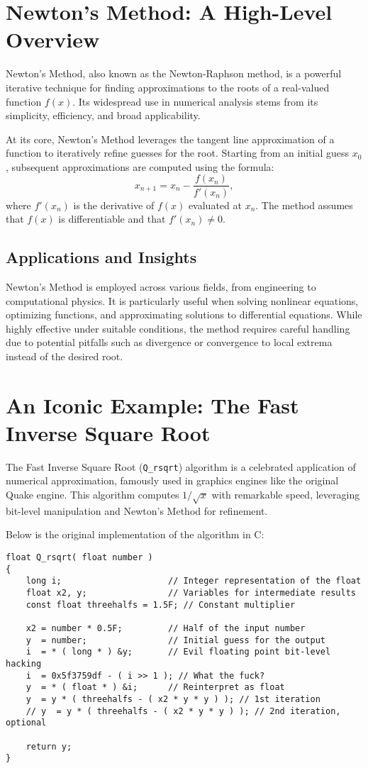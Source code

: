 \section*{Newton's Method: A High-Level Overview}
Newton's Method, also known as the Newton-Raphson method, is a powerful iterative technique for finding approximations to the roots of a real-valued function \(f(x)\). Its widespread use in numerical analysis stems from its simplicity, efficiency, and broad applicability.

At its core, Newton's Method leverages the tangent line approximation of a function to iteratively refine guesses for the root. Starting from an initial guess \(x_0\), subsequent approximations are computed using the formula:
\[
    x_{n+1} = x_n - \frac{f(x_n)}{f'(x_n)},
\]
where \(f'(x_n)\) is the derivative of \(f(x)\) evaluated at \(x_n\). The method assumes that \(f(x)\) is differentiable and that \(f'(x_n) \neq 0\).

\subsection*{Applications and Insights}
Newton's Method is employed across various fields, from engineering to computational physics. It is particularly useful when solving nonlinear equations, optimizing functions, and approximating solutions to differential equations. While highly effective under suitable conditions, the method requires careful handling due to potential pitfalls such as divergence or convergence to local extrema instead of the desired root.

\section*{An Iconic Example: The Fast Inverse Square Root}
The Fast Inverse Square Root (\texttt{Q\_rsqrt}) algorithm is a celebrated application of numerical approximation, famously used in graphics engines like the original Quake engine. This algorithm computes \(1 / \sqrt{x}\) with remarkable speed, leveraging bit-level manipulation and Newton's Method for refinement.

Below is the original implementation of the algorithm in C:

\begin{verbatim}
float Q_rsqrt( float number )
{
    long i;                     // Integer representation of the float
    float x2, y;                // Variables for intermediate results
    const float threehalfs = 1.5F; // Constant multiplier

    x2 = number * 0.5F;         // Half of the input number
    y  = number;                // Initial guess for the output
    i  = * ( long * ) &y;       // Evil floating point bit-level hacking
    i  = 0x5f3759df - ( i >> 1 ); // What the fuck?
    y  = * ( float * ) &i;      // Reinterpret as float
    y  = y * ( threehalfs - ( x2 * y * y ) ); // 1st iteration
    // y  = y * ( threehalfs - ( x2 * y * y ) ); // 2nd iteration, optional

    return y;
}
\end{verbatim}

